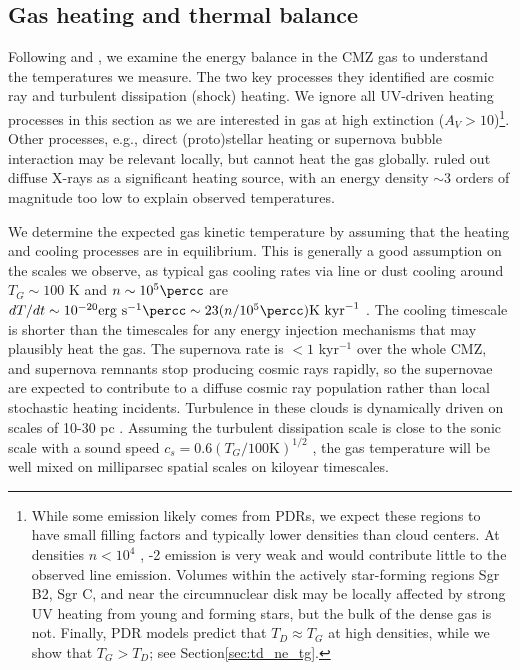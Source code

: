 \subsection{Gas heating and thermal balance}
\label{sec:heating}
Following \citet{Ao2013a} and \citet{Papadopoulos2010a}, we examine the energy
balance in the CMZ gas to understand the temperatures we measure.  The two key
processes they identified are cosmic ray and turbulent dissipation (shock)
heating.  We ignore all UV-driven heating processes in this section as we are
interested in gas at high extinction ($A_V > 10$)\footnote{While some emission
likely comes from PDRs, we expect these regions to have small filling factors
and typically lower densities than cloud centers.  At densities $n<10^4$
\percc, -2 emission is very weak and would contribute little to the
observed line emission.  Volumes within the actively star-forming regions
Sgr B2, Sgr C, and near the circumnuclear disk may be locally affected
by strong UV heating from young and forming stars, but the bulk of the dense
gas is not.  Finally, PDR models \citep[e.g.,][]{Hollenbach1999a} predict that
$T_{D} \approx T_{G}$ at high densities, while we show that $T_{G} >
T_{D}$; see Section\ref{sec:td_ne_tg}.}.
Other processes, e.g.,  direct (proto)stellar heating
or supernova bubble interaction may be relevant locally, but cannot heat the
gas globally.  \citet{Ao2013a} ruled out diffuse X-rays as a significant
heating source, with an energy density $\sim3$ orders of magnitude too low to
explain observed temperatures.

We determine the expected gas kinetic temperature by assuming that the heating
and cooling processes are in equilibrium.  This is generally a good assumption
on the scales we observe, as typical gas cooling rates via line or dust cooling
around $T_G\sim100$ K and $n\sim10^5\percc$ are $dT/dt \sim 10^{-20}
\mathrm{erg~s}^{-1}\percc \sim 23 (n/10^5 \percc) \mathrm{K~kyr}^{-1}$
\citep[][and see below]{Goldsmith2001a}.  The cooling timescale is shorter than
the timescales for any energy injection mechanisms that may plausibly heat the
gas.  The supernova rate is $<1$ kyr$^{-1}$ over the whole CMZ, and supernova
remnants stop producing cosmic rays rapidly, so the supernovae are
expected to contribute to a diffuse cosmic ray population rather than local
stochastic heating incidents.  Turbulence in these clouds is dynamically driven
on scales of 10-30 pc \citep{Kruijssen2015a}.  Assuming the turbulent
dissipation scale is close to the sonic scale with a sound speed $c_s = 0.6
(T_G/100\mathrm{K})^{1/2}$ \kms, the gas temperature will be well mixed on milliparsec
spatial scales on kiloyear timescales.

